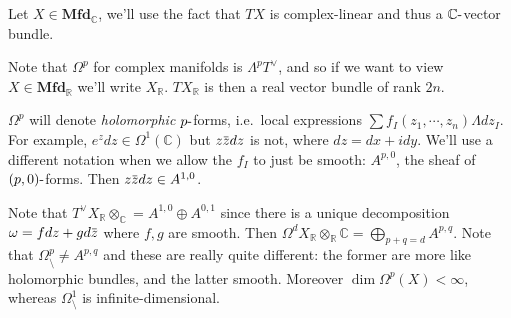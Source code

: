 Let \(X \in {\mathbf{Mfd}}_{\mathbb{C}}\), we'll use the fact that
\(TX\) is complex-linear and thus a \({\mathbb{C}}{\hbox{-}}\)vector
bundle.

\begin{figure}
\centering
{}
\end{figure}

\begin{remark}[Subtlety 1]

Note that \(\Omega^p\) for complex manifolds is \(\Lambda^p T^\vee\),
and so if we want to view \(X \in {\mathbf{Mfd}}_{\mathbb{R}}\) we'll
write \(X_{{\mathbb{R}}}\). \(TX_{\mathbb{R}}\) is then a real vector
bundle of rank \(2n\).

\end{remark}

\begin{remark}[Subtlety 2]

\(\Omega^p\) will denote \emph{holomorphic} \(p{\hbox{-}}\)forms,
i.e.~local expressions \(\sum f_I(z_1, \cdots, z_n) \Lambda dz_I\). For
example, \(e^zdz\in \Omega^1({\mathbb{C}})\) but
\(z\mkern 1.5mu\overline{\mkern-1.5muz\mkern-1.5mu}\mkern 1.5mu dz\) is
not, where \(dz = dx + idy\). We'll use a different notation when we
allow the \(f_I\) to just be smooth: \(A^{p, 0}\), the sheaf of
\((p, 0){\hbox{-}}\)forms. Then
\(z\mkern 1.5mu\overline{\mkern-1.5muz\mkern-1.5mu}\mkern 1.5mu dz\in A^{1, 0}\).

\end{remark}

\begin{remark}

Note that
\(T^\vee X_{\mathbb{R}}\otimes _{\mathbb{C}}= A^{1, 0} \oplus A^{0, 1}\)
since there is a unique decomposition
\(\omega = fdz + gd\mkern 1.5mu\overline{\mkern-1.5muz\mkern-1.5mu}\mkern 1.5mu\)
where \(f,g\) are smooth. Then
\(\Omega^d X_{\mathbb{R}}\otimes_{\mathbb{R}}{\mathbb{C}}= \bigoplus _{p+q=d} A^{p, q}\).
Note that \(\Omega_{\setminus}^p \neq A^{p, q}\) and these are really
quite different: the former are more like holomorphic bundles, and the
latter smooth. Moreover \(\dim \Omega^p(X) < \infty\), whereas
\(\Omega_{\setminus}^1\) is infinite-dimensional.

\end{remark}


